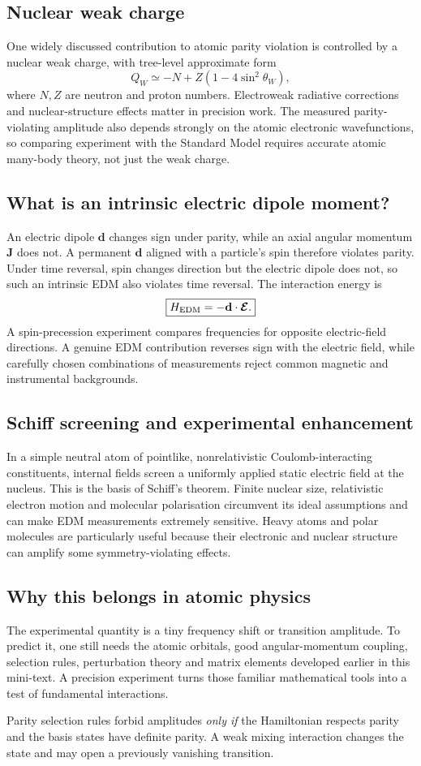 \subsection{Nuclear weak charge}
One widely discussed contribution
to atomic parity violation is
controlled by a nuclear weak charge,
with tree-level approximate form
\[
\boxed{Q_W\simeq-N+Z(1-4\sin^2\theta_W),}
\]
where \(N,Z\) are neutron and proton
numbers. Electroweak radiative
corrections and nuclear-structure
effects matter in precision work.
The measured parity-violating amplitude
also depends strongly on the atomic
electronic wavefunctions, so comparing
experiment with the Standard Model
requires accurate atomic many-body
theory, not just the weak charge.

\subsection{What is an intrinsic electric dipole moment?}
An electric dipole \(\mathbf d\) changes
sign under parity, while an axial
angular momentum \(\mathbf J\) does not.
A permanent \(\mathbf d\) aligned with
a particle's spin therefore violates
parity. Under time reversal,
spin changes direction but the electric
dipole does not, so such an intrinsic
EDM also violates time reversal.
The interaction energy is
\[
\boxed{H_{\rm EDM}=-\mathbf d\cdot
\boldsymbol{\mathcal E}.}
\]
A spin-precession experiment compares
frequencies for opposite electric-field
directions. A genuine EDM contribution
reverses sign with the electric field,
while carefully chosen combinations
of measurements reject common magnetic
and instrumental backgrounds.

\subsection{Schiff screening and experimental enhancement}
In a simple neutral atom of pointlike,
nonrelativistic Coulomb-interacting
constituents, internal fields screen
a uniformly applied static electric
field at the nucleus. This is the
basis of Schiff's theorem.
Finite nuclear size, relativistic
electron motion and molecular
polarisation circumvent its ideal
assumptions and can make EDM
measurements extremely sensitive.
Heavy atoms and polar molecules
are particularly useful because
their electronic and nuclear
structure can amplify some
symmetry-violating effects.

\subsection{Why this belongs in atomic physics}
The experimental quantity is a tiny
frequency shift or transition amplitude.
To predict it, one still needs the
atomic orbitals, good angular-momentum
coupling, selection rules, perturbation
theory and matrix elements developed
earlier in this mini-text.
A precision experiment turns those
familiar mathematical tools into a
test of fundamental interactions.

\begin{checkpoint}
Parity selection rules forbid amplitudes
\emph{only if} the Hamiltonian respects
parity and the basis states have definite
parity. A weak mixing interaction changes
the state and may open a previously
vanishing transition.
\end{checkpoint}
